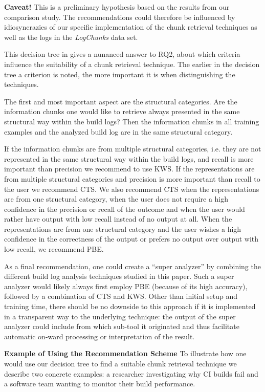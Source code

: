 \noindent
\textbf{Caveat!} This is a preliminary hypothesis based on the results
from our comparison study. The recommendations could therefore be
influenced by idiosyncrazies of our specific implementation of the
chunk retrieval techniques as well as the logs in the \emph{LogChunks}
data set.

This decision tree in  gives a nunanced
answer to RQ2, about which criteria influence the suitability of a
chunk retrieval technique. The earlier in the decision tree a
criterion is noted, the more important it is when distinguishing the
techniques.

The first and most important aspect are the structural categories. Are
the information chunks one would like to retrieve always presented in
the same structural way within the build logs? Then the information
chunks in all training examples and the analyzed build log are in the
same structural category.

If the information chunks are from multiple structural categories,
i.e. they are not represented in the same structural way within the
build logs, and recall is more important than precision we recommend
to use KWS\@. If the representations are from multiple structural
categories and precision is more important than recall to the user we
recommend CTS\@. We also recommend CTS when the representations are
from one structural category, when the user does not require a high
confidence in the precision or recall of the outcome and when the user
would rather have output with low recall instead of no output at all.
When the representations are from one structural category and the user
wishes a high confidence in the correctness of the output or prefers
no output over output with low recall, we recommend PBE\@.

As a final recommendation, one could create a ``super analyzer'' by
combining the different build log analysis techniques studied in this
paper. Such a super analyzer would likely always first employ PBE
(because of its high accuracy), followed by a combination of CTS and
KWS. Other than initial setup and training time, there should be no
downside to this approach if it is implemented in a transparent way to
the underlying technique: the output of the super analyzer could
include from which sub-tool it originated and thus facilitate
automatic on-ward processing or interpretation of the result.


\noindent
\textbf{Example of Using the Recommendation Scheme}
To illustrate how one would use our decision tree to find a suitable
chunk retrieval technique we describe two concrete examples: a
researcher investigating why CI builds fail and a software team
wanting to monitor their build performance.

